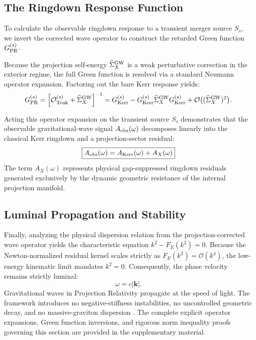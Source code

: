 \documentclass[11pt]{article}
\begin{document}
\subsection{The Ringdown Response Function}
\label{sec:ringdown_response_function}

To calculate the observable ringdown response to a transient merger source $S_s$, we invert the corrected wave operator to construct the retarded Green \cite{friedlander1975wave, Poisson2011} function $G_{\rm PR}^{(s)}$. 

Because the projection self-energy $\widehat{\Sigma}_X^{\rm GW}$ is a weak perturbative correction in the exterior regime, the full Green function is resolved via a standard Neumann \cite{reed1980functional} operator expansion. Factoring out the bare Kerr response yields:
\begin{equation}
G_{\rm PR}^{(s)} = \left[ \mathcal{O}_{\rm Teuk}^{(s)} + \widehat{\Sigma}_X^{\rm GW} \right]^{-1} = G_{\rm Kerr}^{(s)} - G_{\rm Kerr}^{(s)} \widehat{\Sigma}_X^{\rm GW} G_{\rm Kerr}^{(s)} + \mathcal{O}\big((\widehat{\Sigma}_X^{\rm GW})^2\big).
\end{equation}

Acting this operator expansion on the transient source $S_s$ demonstrates that the observable gravitational-wave signal $A_{\rm obs}(\omega)$ decomposes linearly into the classical Kerr ringdown and a projection-sector residual:
\begin{equation}
\boxed{ A_{\rm obs}(\omega) = A_{\rm Kerr}(\omega) + A_X(\omega) }
\end{equation}
The term $A_X(\omega)$ represents physical gap-suppressed ringdown residuals generated exclusively by the dynamic geometric resistance of the internal projection manifold. 

\subsection{Luminal Propagation and Stability}
\label{sec:luminal_propagation}

Finally, analyzing the physical dispersion relation from the projection-corrected wave operator yields the characteristic equation $k^2 - F_E(k^2) = 0$. Because the Newton-normalized residual kernel scales strictly as $F_E(k^2) = \mathcal{O}(k^4)$, the low-energy kinematic limit mandates $k^2 = 0$. Consequently, the phase velocity remains strictly luminal:
\begin{equation}
\omega = c|\mathbf{k}|.
\end{equation}
Gravitational waves in Projection Relativity propagate at the speed of light. The framework introduces no negative-stiffness instabilities, no uncontrolled geometric decay, and no massive-graviton dispersion \cite{Abbott2017_Speed, deRham2011}. The complete explicit operator expansions, Green function inversions, and rigorous norm inequality proofs governing this section are provided in the supplementary material.
\end{document}
